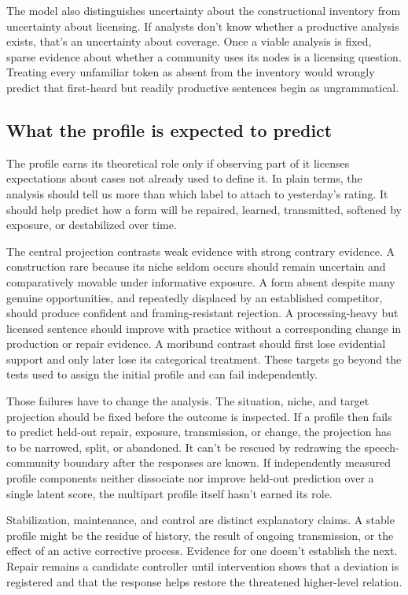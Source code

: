 The model also distinguishes uncertainty about the constructional inventory
from uncertainty about licensing. If analysts don't know whether a productive
analysis exists, that's an uncertainty about coverage. Once a viable analysis
is fixed, sparse evidence about whether a community uses its nodes is a
licensing question. Treating every unfamiliar token as absent from the inventory
would wrongly predict that first-heard but readily productive sentences
begin as ungrammatical.

\subsection{What the profile is expected to predict}
\label{sec:projectible-use}
\label{sec:projectible-G}

The profile earns its theoretical role only if observing part of it licenses
expectations about cases not already used to define it. In plain terms, the
analysis should tell us more than which label to attach to yesterday's rating.
It should help predict how a form will be repaired, learned, transmitted,
softened by exposure, or destabilized over time.

The central projection contrasts weak evidence with strong contrary evidence.
A construction rare because its niche seldom occurs should remain uncertain
and comparatively movable under informative exposure. A form
absent despite many genuine opportunities, and repeatedly displaced by an
established competitor, should produce confident and framing-resistant
rejection. A processing-heavy but licensed sentence should improve with
practice without a corresponding change in production or repair evidence. A
moribund contrast should first lose evidential support and only later lose its
categorical treatment. These targets go beyond the tests used to assign the
initial profile and can fail independently.

Those failures have to change the analysis. The situation, niche, and target
projection should be fixed before the outcome is inspected. If a profile then
fails to predict held-out repair, exposure, transmission, or change, the
projection has to be narrowed, split, or abandoned. It can't be rescued by
redrawing the speech-community boundary after the responses are known.
If independently measured profile components neither dissociate nor improve
held-out prediction over a single latent score, the multipart profile itself
hasn't earned its role.

Stabilization, maintenance, and control are distinct explanatory claims. A
stable profile might be the residue of history, the result of ongoing
transmission, or the effect of an active corrective process. Evidence for one
doesn't establish the next. Repair remains a candidate controller
until intervention shows that a deviation is registered and that the response
helps restore the threatened higher-level relation.

